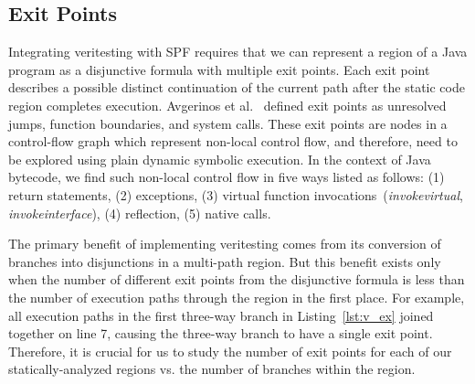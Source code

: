 \subsection{Exit Points}
\label{sec:exit_points}
%
Integrating veritesting with SPF requires that we can represent a region of a Java program as a disjunctive formula with multiple exit points.  Each exit point describes a possible distinct continuation of the current path after the static code region completes execution.  Avgerinos et al.~\cite{veritesting} defined exit points as unresolved jumps, function boundaries, and system calls.
%
These exit points are nodes in a control-flow graph which represent non-local control flow, and therefore, need to be explored using plain dynamic symbolic execution.
%
In the context of Java bytecode, we find such non-local control flow in five ways listed as follows: (1) return statements, (2) exceptions, (3) virtual function invocations~(\textit{invokevirtual}, \textit{invokeinterface}), (4) reflection, (5) native calls.
%

%

%
The primary benefit of implementing veritesting comes from its conversion of branches into disjunctions in a multi-path region.
%
But this benefit exists only when the number of different exit points from the disjunctive formula is less than the number of execution paths through the region in the first place.
%
For example, all execution paths in the first three-way branch in
Listing~\ref{lst:v_ex} joined together on line 7, causing the three-way branch to have a single exit point.
%
Therefore, it is crucial for us to study the number of exit points for each of our statically-analyzed regions vs. the number of branches within the region.
%
%
%

